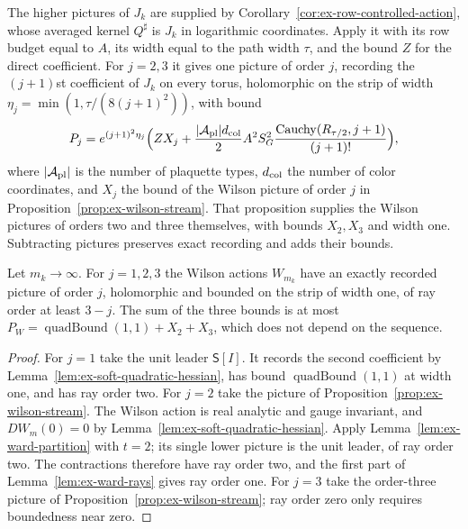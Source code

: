 The higher pictures of $J_k$ are supplied by
Corollary~\ref{cor:ex-row-controlled-action}, whose averaged kernel
$Q^\sharp$ is $J_k$ in logarithmic coordinates. Apply it with its row
budget equal to $A$, its width equal to the path width $\tau$, and the
bound $Z$ for the direct coefficient. For $j=2,3$ it gives one picture
of order $j$, recording the $(j+1)$st coefficient of $J_k$ on every
torus, holomorphic on the strip of width
$\eta_j=\min(1,\tau/(8(j+1)^2))$, with bound
\[
 P_j=e^{(j+1)^2\eta_j}\Bigl(ZX_j
     +\frac{|\mathcal A_{\rm pl}|d_{\rm col}}2A^2S_G^2
      \frac{\operatorname{Cauchy}(R_{\tau/2},j+1)}{(j+1)!}\Bigr),
\]
where $|\mathcal A_{\rm pl}|$ is the number of plaquette types,
$d_{\rm col}$ the number of color coordinates, and $X_j$ the bound of
the Wilson picture of order $j$ in
Proposition~\ref{prop:ex-wilson-stream}. That proposition supplies the
Wilson pictures of orders two and three themselves, with bounds
$X_2,X_3$ and width one. Subtracting pictures preserves exact
recording and adds their bounds.

\begin{lemma}
\label{lem:ex-soft-wilson-pictures}
Let $m_k\to\infty$. For $j=1,2,3$ the Wilson actions $W_{m_k}$ have an
exactly recorded picture of order $j$, holomorphic and bounded on the
strip of width one, of ray order at least $3-j$. The sum of the three
bounds is at most
$P_W=\operatorname{quadBound}(1,1)+X_2+X_3$, which does not depend on
the sequence.
\end{lemma}

\begin{proof}
For $j=1$ take the unit leader $\mathsf S[I]$. It records the second
coefficient by Lemma~\ref{lem:ex-soft-quadratic-hessian}, has bound
$\operatorname{quadBound}(1,1)$ at width one, and has ray order two.
For $j=2$ take the picture of
Proposition~\ref{prop:ex-wilson-stream}. The Wilson action is real
analytic and gauge invariant, and $DW_m(0)=0$ by
Lemma~\ref{lem:ex-soft-quadratic-hessian}. Apply
Lemma~\ref{lem:ex-ward-partition} with $t=2$; its single lower picture
is the unit leader, of ray order two. The contractions therefore have
ray order two, and the first part of Lemma~\ref{lem:ex-ward-rays} gives
ray order one. For $j=3$ take the order-three picture of
Proposition~\ref{prop:ex-wilson-stream}; ray order zero only requires
boundedness near zero.
\end{proof}


